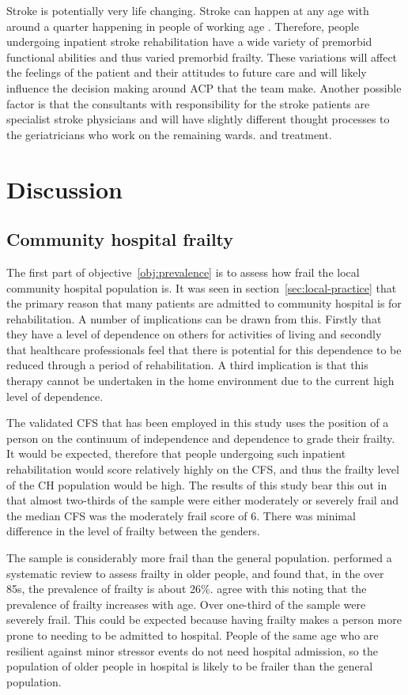 \documentclass
[
	12pt,
	a4paper,
	oneside,
]{report}
\begin{document}
Stroke is potentially very life changing. Stroke can happen at any age with 
around a quarter happening in people of working age \parencite{stroke:18}. 
Therefore, people undergoing 
inpatient stroke rehabilitation have a wide variety of premorbid functional 
abilities and thus varied premorbid frailty. These variations will
affect the feelings of the patient and their attitudes to future care and will
likely influence the decision making around ACP that the team make. Another
possible factor is that the consultants with responsibility for the stroke 
patients are specialist stroke physicians and will have slightly different 
thought processes to the geriatricians who work on the remaining wards.
and treatment.

\chapter{Discussion}

\section{Community hospital frailty}

The first part of objective~\ref{obj:prevalence} is to assess how frail the
local community hospital population is. It was seen in 
section~\ref{sec:local-practice} that the primary reason that many patients are
admitted to community hospital is for rehabilitation. A number of implications 
can be 
drawn from this. Firstly that they have a level of dependence on others for 
activities 
of living and secondly that healthcare professionals feel that there is 
potential for this dependence to be reduced through a period of rehabilitation. A 
third implication is that this therapy cannot be undertaken in the home
environment due to the current high level of dependence.

The validated CFS that has been employed in this study uses the position of a person
on the continuum of independence and dependence to grade their frailty. It
would be expected, therefore that people undergoing such inpatient rehabilitation 
would score relatively highly on the CFS, and thus the frailty level of the 
CH population would be high. The results of this study bear this out in that
almost two-thirds of the sample were either moderately or severely frail
and the median CFS was the moderately frail score of 6. There was minimal
difference in the level of frailty between the genders.

The sample is considerably more frail than the general population. 
\textcite{collard:12} performed a systematic review to assess frailty in older
people, and found that, in the over 85s, the prevalence of frailty is about
26\%. \textcite{clegg:13} agree with this noting that the prevalence of frailty
increases with age. Over one-third of the sample were severely frail. This could
be expected because having frailty makes a person more prone to needing to be
admitted to hospital. People of the same age who are resilient against
minor stressor events do not need hospital admission, so the population of older
people in hospital is likely to be frailer than the general population.
\end{document}
